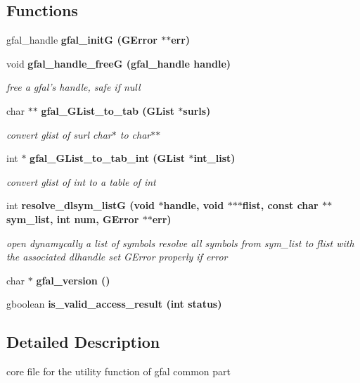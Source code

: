 \subsection*{Functions}
\begin{CompactItemize}
\item 
gfal\_\-handle \bf{gfal\_\-init\-G} (GError $\ast$$\ast$err)
\item 
void \bf{gfal\_\-handle\_\-free\-G} (gfal\_\-handle handle)\label{gfal__common__all_8c_9dbd943eaed291897d852fc3ae560058}

\begin{CompactList}\small\item\em free a gfal's handle, safe if null \item\end{CompactList}\item 
char $\ast$$\ast$ \bf{gfal\_\-GList\_\-to\_\-tab} (GList $\ast$surls)
\begin{CompactList}\small\item\em convert glist of surl char$\ast$ to char$\ast$$\ast$ \item\end{CompactList}\item 
int $\ast$ \bf{gfal\_\-GList\_\-to\_\-tab\_\-int} (GList $\ast$int\_\-list)
\begin{CompactList}\small\item\em convert glist of int to a table of int \item\end{CompactList}\item 
int \bf{resolve\_\-dlsym\_\-list\-G} (void $\ast$handle, void $\ast$$\ast$$\ast$flist, const char $\ast$$\ast$sym\_\-list, int num, GError $\ast$$\ast$err)\label{gfal__common__all_8c_0323a4ab58106e316851c1ae06148e28}

\begin{CompactList}\small\item\em open dynamycally a list of symbols resolve all symbols from sym\_\-list to flist with the associated dlhandle set GError properly if error \item\end{CompactList}\item 
char $\ast$ \bf{gfal\_\-version} ()
\item 
gboolean \bf{is\_\-valid\_\-access\_\-result} (int status)
\end{CompactItemize}


\subsection{Detailed Description}
core file for the utility function of gfal common part 

